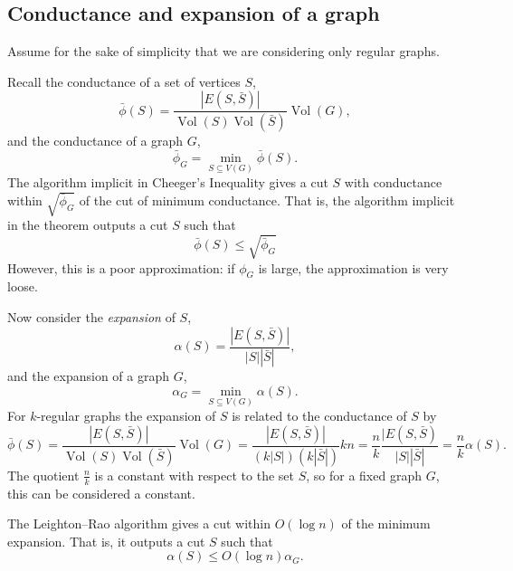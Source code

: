 \documentclass[11pt]{article}
\newcommand{\0}{\mathbf{0}}
\newcommand{\1}{\mathbf{1}}
\DeclareMathOperator{\Vol}{Vol}
\begin{document}
\subsection{Conductance and expansion of a graph}

Assume for the sake of simplicity that we are considering only regular graphs.

Recall the conductance of a set of vertices $S$,
\begin{equation*}
  \bar{\phi}(S) = \frac{|E(S, \bar{S})|}{\Vol(S) \Vol(\bar{S})} \Vol(G),
\end{equation*}
and the conductance of a graph $G$,
\begin{equation*}
  \bar{\phi}_G = \min_{S \subseteq V(G)} \bar{\phi}(S).
\end{equation*}
The algorithm implicit in Cheeger's Inequality gives a cut $S$ with conductance within $\sqrt{\bar{\phi}_G}$ of the cut of minimum conductance.
That is, the algorithm implicit in the theorem outputs a cut $S$ such that
\begin{equation*}
  \bar{\phi}(S) \leq \sqrt{\bar{\phi}_G}
\end{equation*}
However, this is a poor approximation: if $\phi_G$ is large, the approximation is very loose.

Now consider the \emph{expansion} of $S$,
\begin{equation*}
  \alpha(S) = \frac{|E(S, \bar{S})|}{|S| |\bar{S}|},
\end{equation*}
and the expansion of a graph $G$,
\begin{equation*}
  \alpha_G = \min_{S \subseteq V(G)} \alpha(S).
\end{equation*}
For $k$-regular graphs the expansion of $S$ is related to the conductance of $S$ by
\begin{equation*}
  \bar{\phi}(S) = \frac{|E(S, \bar{S})|}{\Vol(S) \Vol(\bar{S})} \Vol(G) = \frac{|E(S, \bar{S})|}{(k |S|) (k |\bar{S}|)} k n = \frac{n}{k} \frac{|E(S, \bar{S})}{|S| |\bar{S}|} = \frac{n}{k} \alpha(S).
\end{equation*}
The quotient $\frac{n}{k}$ is a constant with respect to the set $S$, so for a fixed graph $G$, this can be considered a constant.

The Leighton--Rao algorithm gives a cut within $O(\log n)$ of the minimum expansion.
That is, it outputs a cut $S$ such that
\begin{equation*}
  \alpha(S) \leq O(\log n) \alpha_G.
\end{equation*}
\end{document}
